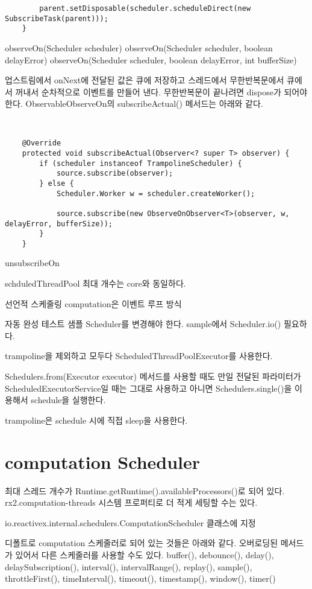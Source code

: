 \documentclass{book}
\begin{document}
{\begin{verbatim}
        parent.setDisposable(scheduler.scheduleDirect(new SubscribeTask(parent)));
    }
\end{verbatim}

observeOn(Scheduler scheduler)
observeOn(Scheduler scheduler, boolean delayError)
observeOn(Scheduler scheduler, boolean delayError, int bufferSize)

업스트림에서 onNext에 전달된 값은 큐에 저장하고 스레드에서 무한반복문에서 큐에서 꺼내서 순차적으로 이벤트를 만들어 낸다.
무한반복문이 끝나려면 dispose가 되어야 한다.
ObservableObserveOn의 subscribeActual() 메서드는 아래와 같다.
\begin{verbatim}


    @Override
    protected void subscribeActual(Observer<? super T> observer) {
        if (scheduler instanceof TrampolineScheduler) {
            source.subscribe(observer);
        } else {
            Scheduler.Worker w = scheduler.createWorker();

            source.subscribe(new ObserveOnObserver<T>(observer, w, delayError, bufferSize));
        }
    }
\end{verbatim}

unsubscribeOn

schduledThreadPool 최대 개수는 core와 동일하다.

선언적 스케줄링
computation은 이벤트 루프 방식

자동 완성 테스트 샘플
Scheduler를 변경해야 한다.
sample에서 Scheduler.io() 필요하다.

trampoline을 제외하고 모두다 ScheduledThreadPoolExecutor를 사용한다.

Schedulers.from(Executor executor) 메서드를 사용할 때도 만일 전달된 파라미터가 ScheduledExecutorService일 때는
그대로 사용하고 아니면 Schedulers.single()을 이용해서 schedule을 실행한다.

trampoline은 schedule 시에 직접 sleep을 사용한다.

\section{computation Scheduler}
최대 스레드 개수가 Runtime.getRuntime().availableProcessors()로 되어 있다.
rx2.computation-threads 시스템 프로퍼티로 더 적게 세팅할 수는 있다.


io.reactivex.internal.schedulers.ComputationScheduler 클래스에 지정

디폴트로 computation 스케줄러로 되어 있는 것들은 아래와 같다.  오버로딩된 
메서드가 있어서 다른 스케줄러를 사용할 수도 있다.
buffer(), debounce(), delay(), delaySubscription(),
interval(), intervalRange(), 
replay(), sample(), throttleFirst(), timeInterval(), timeout(), timestamp(), window(), 
timer()


}
\end{document}
